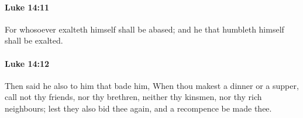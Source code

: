 		\paragraph{Luke 14:11} %
			\label{LUKE-14-11}

			For whosoever exalteth himself shall be abased; and he that humbleth himself shall be exalted.

			\begin{framed}
			\scriptsize
				\begin{compactdesc}
					\item[SBLG] 
				\end{compactdesc}
			\end{framed}

		\paragraph{Luke 14:12} %
			\label{LUKE-14-12}

			Then said he also to him that bade him, When thou makest a dinner or a supper, call not thy friends, nor thy brethren, neither thy kinsmen, nor thy rich neighbours; lest they also bid thee again, and a recompence be made thee.

